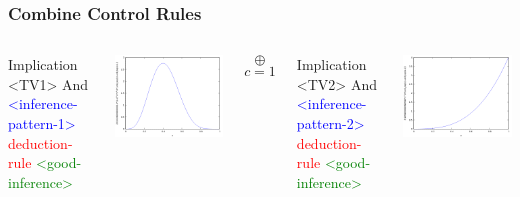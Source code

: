 \documentclass{beamer}
\begin{document}
\begin{frame}[fragile]
  \frametitle{Combine Control Rules}

\begin{columns}

\column{1.1in}

{\tiny
\begin{semiverbatim}
Implication <TV1>
  And
    \textcolor{blue}{<inference-pattern-1>}
    \textcolor{red}{deduction-rule}
  \textcolor{green}{<good-inference>}
\end{semiverbatim}
}

\includegraphics[scale=0.2]{images/Beta_4_6_alpha.png}

\column{0.4in}
\begin{center}
  $$\oplus$$
  {\tiny $$c=1$$}
\end{center}

\column{1.3in}

{\tiny
\begin{semiverbatim}
Implication <TV2>
  And
    \textcolor{blue}{<inference-pattern-2>}
    \textcolor{red}{deduction-rule}
  \textcolor{green}{<good-inference>}
\end{semiverbatim}
}

\includegraphics[scale=0.2]{images/Beta_3_0_alpha.png}


\end{columns}
\end{frame}
\end{document}
